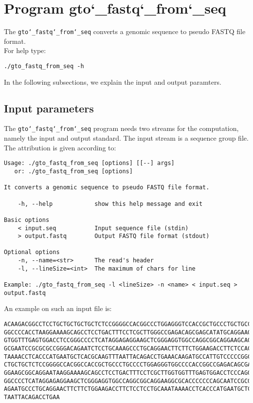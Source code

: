 \section{Program gto\char`_fastq\char`_from\char`_seq}
The \texttt{gto\char`_fastq\char`_from\char`_seq} converts a genomic sequence to pseudo FASTQ file format.\\
For help type:
\begin{lstlisting}
./gto_fastq_from_seq -h
\end{lstlisting}
In the following subsections, we explain the input and output paramters.

\subsection*{Input parameters}

The \texttt{gto\char`_fastq\char`_from\char`_seq} program needs two streams for the computation,
namely the input and output standard. The input stream is a sequence group file.\\
The attribution is given according to:
\begin{lstlisting}
Usage: ./gto_fastq_from_seq [options] [[--] args]
   or: ./gto_fastq_from_seq [options]

It converts a genomic sequence to pseudo FASTQ file format.

    -h, --help            show this help message and exit

Basic options
    < input.seq           Input sequence file (stdin)
    > output.fastq        Output FASTQ file format (stdout)

Optional options
    -n, --name=<str>      The read's header
    -l, --lineSize=<int>  The maximum of chars for line

Example: ./gto_fastq_from_seq -l <lineSize> -n <name> < input.seq > output.fastq
\end{lstlisting}
An example on such an input file is:
\begin{lstlisting}
ACAAGACGGCCTCCTGCTGCTGCTGCTCTCCGGGGCCACGGCCCTGGAGGGTCCACCGCTGCCCTGCTGCCATTGTCCCC
GGCCCCACCTAAGGAAAAGCAGCCTCCTGACTTTCCTCGCTTGGGCCGAGACAGCGAGCATATGCAGGAAGCGGCAGGAA
GTGGTTTGAGTGGACCTCCGGGCCCCTCATAGGAGAGGAAGCTCGGGAGGTGGCCAGGCGGCAGGAAGCAGGCCAGTGCC
GCGAATCCGCGCGCCGGGACAGAATCTCCTGCAAAGCCCTGCAGGAACTTCTTCTGGAAGACCTTCTCCACCCCCCCAGC
TAAAACCTCACCCATGAATGCTCACGCAAGTTTAATTACAGACCTGAAACAAGATGCCATTGTCCCCCGGCCTCCTGCTG
CTGCTGCTCTCCGGGGCCACGGCCACCGCTGCCCTGCCCCTGGAGGGTGGCCCCACCGGCCGAGACAGCGAGCATATGCA
GGAAGCGGCAGGAATAAGGAAAAGCAGCCTCCTGACTTTCCTCGCTTGGTGGTTTGAGTGGACCTCCCAGGCCAGTGCCG
GGCCCCTCATAGGAGAGGAAGCTCGGGAGGTGGCCAGGCGGCAGGAAGGCGCACCCCCCCAGCAATCCGCGCGCCGGGAC
AGAATGCCCTGCAGGAACTTCTTCTGGAAGACCTTCTCCTCCTGCAAATAAAACCTCACCCATGAATGCTCACGCAAGTT
TAATTACAGACCTGAA
\end{lstlisting}

